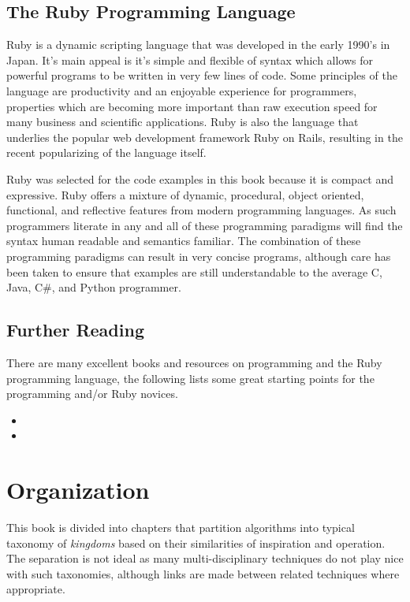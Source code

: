 \subsection{The Ruby Programming Language}
Ruby is a dynamic scripting language that was developed in the early 1990's in Japan. It's main appeal is it's simple and flexible of syntax which allows for powerful programs to be written in very few lines of code. Some principles of the language are productivity and an enjoyable experience for programmers, properties which are becoming more important than raw execution speed for many business and scientific applications. Ruby is also the language that underlies the popular web development framework Ruby on Rails, resulting in the recent popularizing of the language itself.

Ruby was selected for the code examples in this book because it is compact and expressive. Ruby offers a mixture of dynamic, procedural, object oriented, functional, and reflective features from modern programming languages. As such programmers literate in any and all of these programming paradigms will find the syntax human readable and semantics familiar. The combination of these programming paradigms can result in very concise programs, although care has been taken to ensure that examples are still understandable to the average C, Java, C\#, and Python programmer.

\subsection{Further Reading}
There are many excellent books and resources on programming and the Ruby programming language, the following lists some great starting points for the programming and/or Ruby novices.

\begin{itemize}
	\item {}
	\item {}
\end{itemize}


\section{Organization}
This book is divided into chapters that partition algorithms into typical taxonomy of \emph{kingdoms} based on their similarities of inspiration and operation. The separation is not ideal as many multi-disciplinary techniques do not play nice with such taxonomies, although links are made between related techniques where appropriate.
